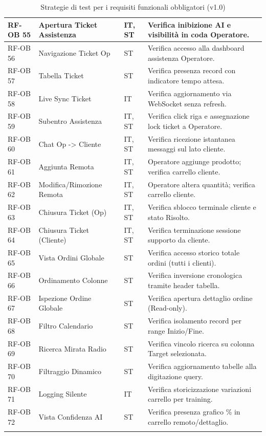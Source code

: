 \documentclass[a4paper,11pt,oneside]{scrartcl}
\begin{document}
\begin{longtable}{|p{1.5cm}|p{4.5cm}|p{1.8cm}|p{6cm}|}
RF-OB 55 & Apertura Ticket Assistenza & IT, ST & Verifica inibizione AI e visibilità in coda Operatore. \\ \hline
RF-OB 56 & Navigazione Ticket Op & ST & Verifica accesso alla dashboard assistenza Operatore. \\ \hline
RF-OB 57 & Tabella Ticket & ST & Verifica presenza record con indicatore tempo attesa. \\ \hline
RF-OB 58 & Live Sync Ticket & IT & Verifica aggiornamento via WebSocket senza refresh. \\ \hline
RF-OB 59 & Subentro Assistenza & IT, ST & Verifica click riga e assegnazione lock ticket a Operatore. \\ \hline
RF-OB 60 & Chat Op -> Cliente & IT, ST & Verifica ricezione istantanea messaggi sul lato cliente. \\ \hline
RF-OB 61 & Aggiunta Remota & IT, ST & Operatore aggiunge prodotto; verifica carrello cliente. \\ \hline
RF-OB 62 & Modifica/Rimozione Remota & IT, ST & Operatore altera quantità; verifica carrello cliente. \\ \hline
RF-OB 63 & Chiusura Ticket (Op) & IT, ST & Verifica sblocco terminale cliente e stato Risolto. \\ \hline
RF-OB 64 & Chiusura Ticket (Cliente) & IT, ST & Verifica terminazione sessione supporto da cliente. \\ \hline
RF-OB 65 & Vista Ordini Globale & ST & Verifica accesso storico totale ordini (tutti i clienti). \\ \hline
RF-OB 66 & Ordinamento Colonne & ST & Verifica inversione cronologica tramite header tabella. \\ \hline
RF-OB 67 & Ispezione Ordine Globale & ST & Verifica apertura dettaglio ordine (Read-only). \\ \hline
RF-OB 68 & Filtro Calendario & ST & Verifica isolamento record per range Inizio/Fine. \\ \hline
RF-OB 69 & Ricerca Mirata Radio & ST & Verifica vincolo ricerca su colonna Target selezionata. \\ \hline
RF-OB 70 & Filtraggio Dinamico & ST & Verifica aggiornamento tabelle alla digitazione query. \\ \hline
RF-OB 71 & Logging Silente & IT & Verifica storicizzazione variazioni carrello per training. \\ \hline
RF-OB 72 & Vista Confidenza AI & ST & Verifica presenza grafico \% in carrello remoto/dettaglio. \\ \hline
\caption{Strategie di test per i requisiti funzionali obbligatori (v1.0)}
\end{longtable}
\end{document}
